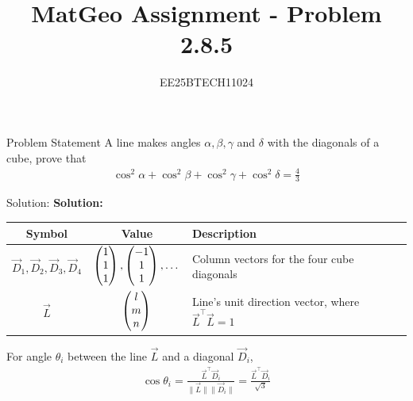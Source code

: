 \documentclass{beamer}
\title{MatGeo Assignment - Problem 2.8.5}
\author{EE25BTECH11024}
\institute{IIT Hyderabad}
\begin{document}
\begin{frame}
  \titlepage
\end{frame}

\begin{frame}{Problem Statement}
A line makes angles $\alpha, \beta, \gamma$ and $\delta$ with the diagonals of a cube, prove that
\begin{align}
\cos^2\alpha + \cos^2\beta + \cos^2\gamma + \cos^2\delta = \frac{4}{3}
\end{align}
\end{frame}

\begin{frame}{Solution: }
\noindent
\textbf{Solution:}\\

\begin{center}
    \begin{tabular}{|c|c|p{5cm}|}
    \hline
    \textbf{Symbol} & \textbf{Value} & \textbf{Description}  \\
    \hline
    \textbf{$\vec{D}_1, \vec{D}_2, \vec{D}_3, \vec{D}_4$} & $\begin{pmatrix}1\\1\\1\end{pmatrix}, \begin{pmatrix}-1\\1\\1\end{pmatrix}, \dots$ & Column vectors for the four cube diagonals \\
    \hline
    \textbf{$\vec{L}$} & $\begin{pmatrix}l \\ m \\ n\end{pmatrix}$ & Line's unit direction vector, where $\vec{L}^\top\vec{L} = 1$ \\
    \hline
    \end{tabular}
\end{center}
\noindent

\noindent
For angle $\theta_i$ between the line $\vec{L}$ and a diagonal $\vec{D}_i$,
\begin{align}
    \cos\theta_i = \frac{\vec{L}^\top \vec{D}_i}{\|\vec{L}\| \|\vec{D}_i\|} = \frac{\vec{L}^\top \vec{D}_i}{\sqrt{3}}
    \label{eq:2.8.5.1}
\end{align}

\end{frame}
\end{document}
